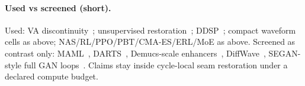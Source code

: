 \paragraph{Used vs screened (short).}
Used: VA discontinuity~\cite{stilson1996,esqueda2016blamp,nam2009polyblep}; unsupervised restoration~\cite{lehtinen2018,kashyap2021n2n,wisdom2020}; DDSP~\cite{engel2020}; compact waveform cells as above; NAS/RL/PPO/PBT/CMA-ES/ERL/MoE as above.
Screened as contrast only: MAML~\cite{finn2017}, DARTS~\cite{liu2019}, Demucs-scale enhancers~\cite{dfossez2019,dfossez2021}, DiffWave~\cite{kong2021}, SEGAN-style full GAN loops~\cite{pascual2017}.
Claims stay inside cycle-local seam restoration under a declared compute budget.
